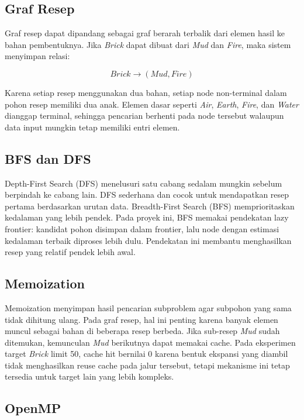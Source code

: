 \documentclass[conference]{IEEEtran}
\begin{document}
\subsection{Graf Resep}

Graf resep dapat dipandang sebagai graf berarah terbalik dari elemen hasil ke bahan pembentuknya. Jika \textit{Brick} dapat dibuat dari \textit{Mud} dan \textit{Fire}, maka sistem menyimpan relasi:

\begin{equation}
\textit{Brick} \rightarrow (\textit{Mud}, \textit{Fire})
\end{equation}

Karena setiap resep menggunakan dua bahan, setiap node non-terminal dalam pohon resep memiliki dua anak. Elemen dasar seperti \textit{Air}, \textit{Earth}, \textit{Fire}, dan \textit{Water} dianggap terminal, sehingga pencarian berhenti pada node tersebut walaupun data input mungkin tetap memiliki entri elemen.

\subsection{BFS dan DFS}

Depth-First Search (DFS) menelusuri satu cabang sedalam mungkin sebelum berpindah ke cabang lain. DFS sederhana dan cocok untuk mendapatkan resep pertama berdasarkan urutan data. Breadth-First Search (BFS) memprioritaskan kedalaman yang lebih pendek. Pada proyek ini, BFS memakai pendekatan lazy frontier: kandidat pohon disimpan dalam frontier, lalu node dengan estimasi kedalaman terbaik diproses lebih dulu. Pendekatan ini membantu menghasilkan resep yang relatif pendek lebih awal.

\subsection{Memoization}

Memoization menyimpan hasil pencarian subproblem agar subpohon yang sama tidak dihitung ulang. Pada graf resep, hal ini penting karena banyak elemen muncul sebagai bahan di beberapa resep berbeda. Jika sub-resep \textit{Mud} sudah ditemukan, kemunculan \textit{Mud} berikutnya dapat memakai cache. Pada eksperimen target \textit{Brick} limit 50, cache hit bernilai 0 karena bentuk ekspansi yang diambil tidak menghasilkan reuse cache pada jalur tersebut, tetapi mekanisme ini tetap tersedia untuk target lain yang lebih kompleks.

\subsection{OpenMP}
\end{document}
